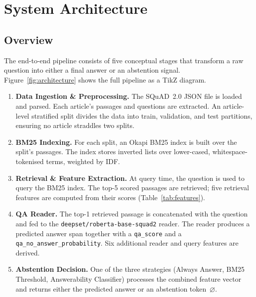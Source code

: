 \chapter{System Architecture}
\label{chap:architecture}

\section{Overview}
\label{sec:arch_overview}

The end-to-end pipeline consists of five conceptual stages that transform a raw
question into either a final answer or an abstention signal. Figure~\ref{fig:architecture}
shows the full pipeline as a TikZ diagram.

\begin{enumerate}
  \item \textbf{Data Ingestion \& Preprocessing.}  The SQuAD~2.0 JSON file is
        loaded and parsed. Each article's passages and questions are extracted.
        An article-level stratified split divides the data into train, validation,
        and test partitions, ensuring no article straddles two splits.

  \item \textbf{BM25 Indexing.}  For each split, an Okapi BM25 index is built
        over the split's passages. The index stores inverted lists over
        lower-cased, whitespace-tokenised terms, weighted by IDF.

  \item \textbf{Retrieval \& Feature Extraction.}  At query time, the question
        is used to query the BM25 index. The top-5 scored passages are
        retrieved; five retrieval features are computed from their scores
        (Table~\ref{tab:features}).

  \item \textbf{QA Reader.}  The top-1 retrieved passage is concatenated with
        the question and fed to the \texttt{deepset/roberta-base-squad2}
        reader. The reader produces a predicted answer span together with a
        \texttt{qa\_score} and a \texttt{qa\_no\_answer\_probability}. Six
        additional reader and query features are derived.

  \item \textbf{Abstention Decision.}  One of the three strategies
        (Always Answer, BM25 Threshold, Answerability Classifier) processes the
        combined feature vector and returns either the predicted answer or an
        abstention token~$\varnothing$.
\end{enumerate}

